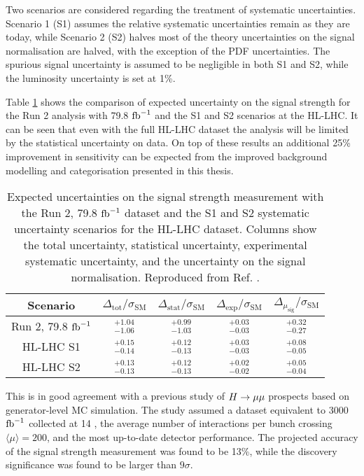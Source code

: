 Two scenarios are considered regarding the treatment of systematic
uncertainties. Scenario 1 (S1) assumes the relative systematic
uncertainties remain as they are today, while Scenario 2 (S2)
halves most of the theory uncertainties on the signal normalisation
are halved, with the exception of the PDF uncertainties. The
spurious signal uncertainty is assumed to be negligible in both S1
and S2, while the luminosity uncertainty is set at 1\%.

Table \ref{tab:out:res} shows the comparison of expected uncertainty
on the signal strength for the Run 2 analysis with 79.8 $\text{fb}^{-1}$
and the S1 and S2 scenarios at the HL-LHC. It can be seen that 
even with the full HL-LHC dataset the analysis will be limited
by the statistical uncertainty on data. On top of these results
an additional 25\% improvement in sensitivity can be expected
from the improved background modelling and categorisation
presented in this thesis.

\begin{table}[htb]
  \renewcommand{\arraystretch}{1.3}
  \centering
  \caption{
    Expected uncertainties on the signal strength measurement with
    the Run 2, 79.8 $\text{fb}^{-1}$ dataset and the S1 and S2 systematic
    uncertainty scenarios for the HL-LHC dataset. Columns show
    the total uncertainty, statistical uncertainty, experimental
    systematic uncertainty, and the uncertainty on the signal
    normalisation.
    Reproduced from Ref. \cite{ATL-PHYS-PUB-2018-054}.}
  \label{tab:out:res}
  \begin{tabular}{ccccc}
    \toprule
    \midrule
    Scenario & $\Delta_\text{tot}/\sigma_\text{SM}$ 
             & $\Delta_\text{stat}/\sigma_\text{SM}$ 
             & $\Delta_\text{exp}/\sigma_\text{SM}$ 
             & $\Delta_{\mu_\text{sig}}/\sigma_\text{SM}$ \\
    \midrule
    Run 2, 79.8 $\text{fb}^{-1}$ & $^{+1.04}_{-1.06}$ & $^{+0.99}_{-1.03}$ & $^{+0.03}_{-0.03}$ & $^{+0.32}_{-0.27}$ \\
    HL-LHC S1          & $^{+0.15}_{-0.14}$ & $^{+0.12}_{-0.13}$ & $^{+0.03}_{-0.03}$ & $^{+0.08}_{-0.05}$ \\
    HL-LHC S2          & $^{+0.13}_{-0.13}$ & $^{+0.12}_{-0.13}$ & $^{+0.02}_{-0.02}$ & $^{+0.05}_{-0.04}$ \\
    \midrule
    \bottomrule
  \end{tabular}
\end{table}

This is in good agreement with a previous study of $H \rightarrow \mu\mu$ prospects
\cite{ATL-PHYS-PUB-2018-006} based on generator-level MC simulation.
The study assumed a dataset equivalent to 3000 $\text{fb}^{-1}$ collected at 14
\TeV, the average number of interactions per bunch crossing
$\langle \mu \rangle = 200$, and the most up-to-date detector performance.
The projected accuracy of the signal strength measurement was found to
be 13\%, while the discovery significance was found to be larger than
$9\sigma$.

